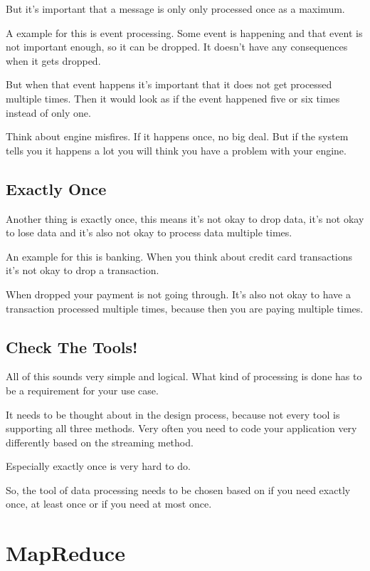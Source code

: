 \documentclass[12pt, numbers=noenddot]{scrreprt} %
\begin{document}
But it’s important that a message is only only processed once as a maximum.

A example for this is event processing. Some event is happening and that event is not important enough, so it can be dropped. It doesn’t have any consequences when it gets dropped.

But when that event happens it’s important that it does not get processed multiple times. Then it would look as if the event happened five or six times instead of only one.

Think about engine misfires. If it happens once, no big deal. But if the system tells you it happens a lot you will think you have a problem with your engine.

\subsection{Exactly Once}

Another thing is exactly once, this means it’s not okay to drop data, it’s not okay to lose data and it’s also not okay to process data multiple times.

An example for this is banking. When you think about credit card transactions it’s not okay to drop a transaction.

When dropped your payment is not going through. It’s also not okay to have a transaction processed multiple times, because then you are paying multiple times.

\subsection{Check The Tools!}

All of this sounds very simple and logical. What kind of processing is done has to be a requirement for your use case.

It needs to be thought about in the design process, because not every tool is supporting all three methods. Very often you need to code your application very differently based on the streaming method.

Especially exactly once is very hard to do.

So, the tool of data processing needs to be chosen based on if you need exactly once, at least once or if you need at most once.



\section{MapReduce}
\end{document}

